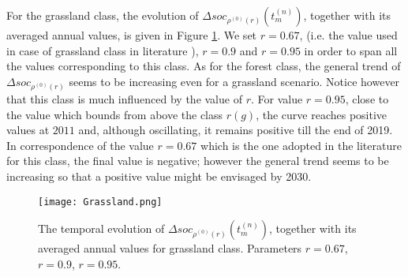 For the grassland  class, the evolution of $\Delta soc_{\rho^{(0)}(r)}(t^{(n)}_{m})$, together with its averaged annual values, is given in Figure \ref{fig:grassland}. We set $r=0.67$, (i.e. the value used in case of grassland class in literature \cite{coleman1996rothc}), $r=0.9$ and $r=0.95$ in order to span all the values corresponding to this class.   As for the forest class, the general trend of $\Delta soc_{\rho^{(0)}(r)}$ seems to be increasing even for a grassland scenario. Notice however that this class is much influenced by the value of $r$. For value $r=0.95$, close to the value which bounds from above the class $r(g)$, the curve reaches positive values at $2011$  and, although oscillating, it remains positive till the end of 2019. In correspondence of the value  $r=0.67$ which is the one adopted in the literature for this class, the final value is negative; however the general trend  seems to be increasing so that a positive value might be envisaged by 2030.  
\begin{figure}[t] 
\begin{center} 
  \texttt{[image: Grassland.png]}
  \end{center}
  \caption{The temporal evolution of $\Delta soc_{\rho^{(0)}(r)}(t^{(n)}_{m})$, together with its averaged annual values for grassland class. Parameters $r=0.67$, $r=0.9$, $r=0.95$. }\label{fig:grassland}
\end{figure}
